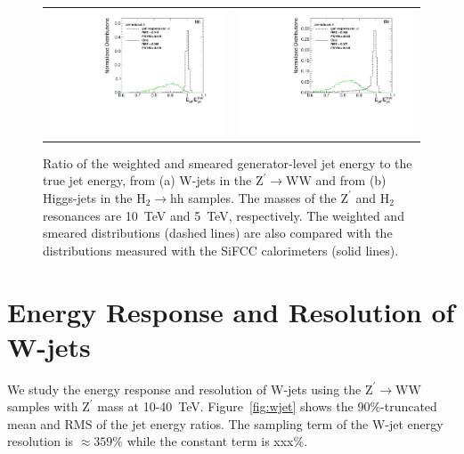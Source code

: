 \documentclass{PoS}
\begin{document}
\begin{figure}
\begin{center}
\begin{tabular}{cc}
\includegraphics[width=.4\textwidth]{figs/ZprimeWW_radius0p4_h_jeratio_gen_response.pdf} &
\includegraphics[width=.4\textwidth]{figs/2HDM_radius0p4_h_jeratio_gen_response.pdf} \\
\end{tabular}
\end{center}
\caption{Ratio of the weighted and smeared generator-level jet energy to 
 the true jet energy, from (a) W-jets in the 
$\mathrm{Z}^{\prime}\rightarrow \mathrm{WW}$ and from (b) Higgs-jets in 
the $\mathrm{H}_2\rightarrow \mathrm{hh}$ samples. The masses 
of the $\mathrm{Z}^{\prime}$ and $\mathrm{H}_2$ resonances 
are 10~TeV and 5~TeV, respectively. The weighted and smeared distributions 
(dashed lines) are also compared with the distributions measured 
with the SiFCC calorimeters (solid lines).}
\label{fig:weight}
\end{figure}


\section{Energy Response and Resolution of W-jets \label{sec:jetresponse}}
We study the energy response and resolution of W-jets using the 
$\mathrm{Z}^{\prime}\rightarrow \mathrm{WW}$ samples with $\mathrm{Z}^{\prime}$ 
mass at 10-40~TeV. Figure~\ref{fig:wjet} shows the 90\%-truncated mean 
and RMS of the jet energy ratios. The sampling term of the W-jet energy 
resolution is $\approx 359\%$ while the constant term is xxx\%.
\end{document}
